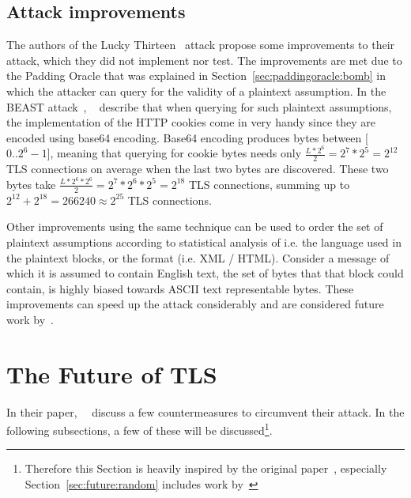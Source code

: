 \documentclass[10pt,conference,a4paper]{IEEEtran}
\begin{document}
\subsection{Attack improvements}
\label{sec:lucky:improvements}
The authors of the Lucky Thirteen~\cite{alfardan2013lucky} attack propose some improvements to their attack, which they did not implement nor test. The improvements are met due to the Padding Oracle that was explained in Section~\ref{sec:paddingoracle:bomb} in which the attacker can query for the validity of a plaintext assumption. In the BEAST attack~\cite{duong2011here}, ~\citeauthor{duong2011here} describe that when querying for such plaintext assumptions, the implementation of the HTTP cookies come in very handy since they are encoded using base64 encoding. Base64 encoding produces bytes between [$0..2^6-1$], meaning that querying for cookie bytes needs only $\frac{L*2^{6}}{2} = 2^7 * 2^5 = 2^{12}$ TLS connections on average when the last two bytes are discovered. These two bytes take $\frac{L*2^6*2^6}{2} = 2^7*2^6*2^5 = 2^{18}$ TLS connections, summing up to $2^{12} + 2^{18} = 266240 \approx 2^{25}$ TLS connections.

Other improvements using the same technique can be used to order the set of plaintext assumptions according to statistical analysis of i.e. the language used in the plaintext blocks, or the format (i.e. XML / HTML). Consider a message of which it is assumed to contain English text, the set of bytes that that block could contain, is highly biased towards ASCII text representable bytes. These improvements can speed up the attack considerably and are considered future work by~\citeauthor{alfardan2013lucky}.




\section{The Future of TLS}
\label{sec:future}
In their paper,~\citeauthor{alfardan2013lucky}~\cite{alfardan2013lucky} discuss a few countermeasures to circumvent their attack. In the following subsections, a few of these will be discussed\footnote{Therefore this Section is heavily inspired by the original paper~\cite{alfardan2013lucky}, especially Section~\ref{sec:future:random} includes work by~\citeauthor{alfardan2013lucky}}.

\end{document}
